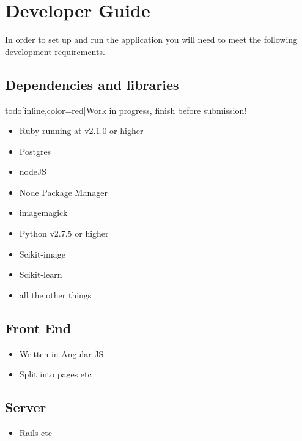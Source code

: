 \chapter{Developer Guide}

In order to set up and run the \noteED application you will need to meet the following development requirements.

\section{Dependencies and libraries}
todo[inline,color=red]{Work in progress, finish before submission!}
\begin{itemize}
  \item Ruby running at v2.1.0 or higher
  \item Postgres
  \item nodeJS
  \item Node Package Manager
  \item imagemagick
  \item Python v2.7.5 or higher
  \item Scikit-image
  \item Scikit-learn
  \item all the other things
\end{itemize}


\section{Front End}

\begin{itemize}
  \item Written in Angular JS
  \item Split into pages etc
\end{itemize}


\section{Server}

\begin{itemize}
  \item Rails etc
\end{itemize}

